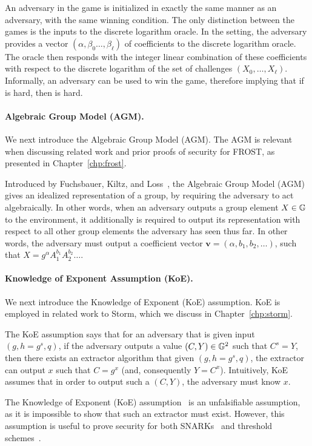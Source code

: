 An adversary in the \AOMDL game is initialized in exactly the same manner as an \OMDL adversary,
with the same winning condition.
The only distinction between the games is the inputs to the discrete logarithm oracle.
In the \AOMDL setting, the adversary provides a vector $(\alpha, \beta_0 \ldots, \beta_\ell)$ of coefficients to the discrete logarithm oracle.
The oracle then responds with the integer linear combination of these coefficients with respect to the
discrete logarithm of the set of challenges $(X_0, \ldots, X_\ell)$.
Informally, an \AOMDL adversary can be used to win the \OMDL game,
therefore implying that if \OMDL is hard, then \AOMDL is hard.


\paragraph{Algebraic Group Model (AGM).}

We next introduce the Algebraic Group Model (AGM).
The AGM is relevant when discussing related work and prior proofs of security for FROST,
as presented in Chapter~\ref{chp:frost}.


Introduced by Fuchsbauer, Kiltz, and Loss~\cite{FuchsbauerKL18},
the Algebraic Group Model (AGM) gives an idealized representation of a group,
by requiring the adversary to act algebraically.
In other words,
when an adversary outputs a group element $X \in \mathbb{G}$ to the environment,
it additionally is required to output its representation with respect to all
other group elements the adversary has seen thus far.
In other words, the adversary must output a coefficient vector $\textbf{v} = (\alpha, b_1, b_2, \ldots)$,
such that $X = g^\alpha A_1^{b_1} A_2^{b_2} \ldots$.


\paragraph{Knowledge of Exponent Assumption (KoE).}

We next introduce the Knowledge of Exponent (KoE) assumption.
KoE is employed in related work to Storm,
which we discuss in Chapter~\ref{chp:storm}.

The KoE assumption says that for an adversary that is given input $(g, h=g^s, q)$,
if the adversary outputs a value $(C, Y) \in \mathbb{G}^2$ such that $C^s = Y$,
then there exists an extractor algorithm that given $(g, h=g^s, q)$,
the extractor can output $x$ such that $C = g^x$ (and, consequently $Y = C^x$).
Intuitively, KoE assumes that in order to output such a $(C, Y)$,
the adversary must know $x$.

The Knowledge of Exponent (KoE) assumption~\cite{Damgard91,BellareP04} is an unfalsifiable assumption,
as it is impossible to show that such an extractor must exist.
However, this assumption is useful to prove security for both SNARKs~\cite{Groth10} and threshold  \allowbreak schemes~\cite{BellareCKMTZ22}.


